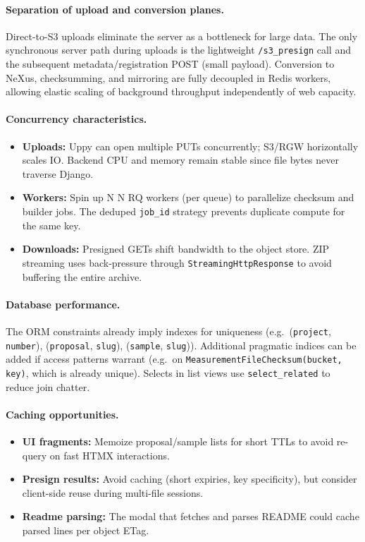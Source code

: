 \paragraph{Separation of upload and conversion planes.}
Direct-to-S3 uploads eliminate the server as a bottleneck for large data. The only synchronous server path during uploads is the lightweight \texttt{/s3\_presign} call and the subsequent metadata/registration POST (small payload). Conversion to NeXus, checksumming, and mirroring are fully decoupled in Redis workers, allowing elastic scaling of background throughput independently of web capacity.

\paragraph{Concurrency characteristics.}
\begin{itemize}
	\item \textbf{Uploads:} Uppy can open multiple PUTs concurrently; S3/RGW horizontally scales IO. Backend CPU and memory remain stable since file bytes never traverse Django.
	\item \textbf{Workers:} Spin up 
	N
	N RQ workers (per queue) to parallelize checksum and builder jobs. The deduped \texttt{job\_id} strategy prevents duplicate compute for the same key.
	\item \textbf{Downloads:} Presigned GETs shift bandwidth to the object store. ZIP streaming uses back-pressure through \texttt{StreamingHttpResponse} to avoid buffering the entire archive.
\end{itemize}

\paragraph{Database performance.}
The ORM constraints already imply indexes for uniqueness (e.g.\ (\texttt{project}, \texttt{number}), (\texttt{proposal}, \texttt{slug}), (\texttt{sample}, \texttt{slug})). Additional pragmatic indices can be added if access patterns warrant (e.g.\ on \texttt{MeasurementFileChecksum(bucket, key)}, which is already unique). Selects in list views use \texttt{select\_related} to reduce join chatter.

\paragraph{Caching opportunities.}
\begin{itemize}
	\item \textbf{UI fragments:} Memoize proposal/sample lists for short TTLs to avoid re-query on fast HTMX interactions.
	\item \textbf{Presign results:} Avoid caching (short expiries, key specificity), but consider client-side reuse during multi-file sessions.
	\item \textbf{Readme parsing:} The modal that fetches and parses README could cache parsed lines per object ETag.
\end{itemize}

